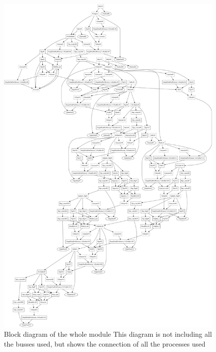 \begin{figure}
  \centering
  \includegraphics[width=1\linewidth]{Pictures/feedforward_diagram.png}
  \caption{Block diagram of the whole module  This diagram is not including all the busses used, but shows the connection of all the processes used}
  \label{fig:fnn_block_sme}
\end{figure}

